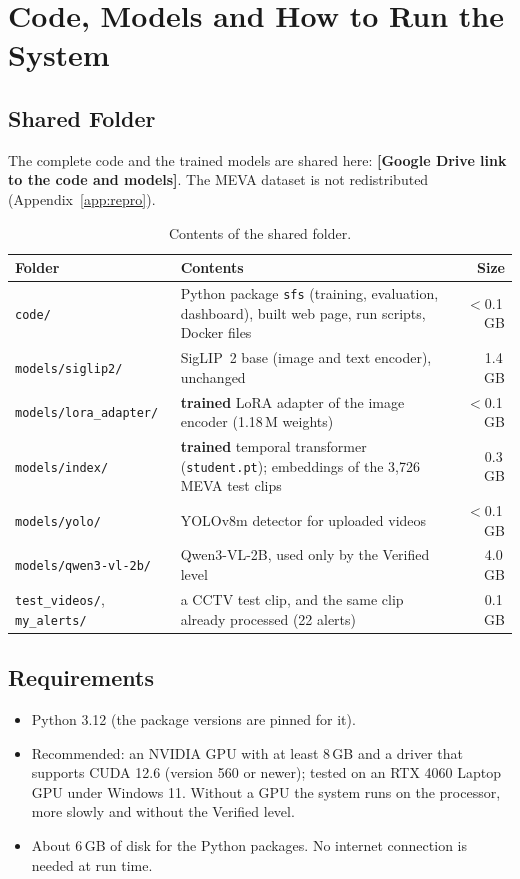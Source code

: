 \documentclass[11pt,a4paper]{article}
\newcommand{\CodeLink}{[Google Drive link to the code and models]}
\begin{document}
\appendix
\section{Code, Models and How to Run the System}\label{app:code}

\subsection{Shared Folder}
The complete code and the trained models are shared here: \textbf{\CodeLink}. The MEVA dataset is not
redistributed (Appendix~\ref{app:repro}).

\begin{table}[H]
\centering
\caption{Contents of the shared folder.}\label{tab:folder}
\small
\begin{tabular}{p{3.6cm}p{9.0cm}r}
\toprule
\textbf{Folder} & \textbf{Contents} & \textbf{Size} \\
\midrule
\texttt{code/} & Python package \texttt{sfs} (training, evaluation, dashboard), built web page, run scripts, Docker files & $<$0.1\,GB \\
\texttt{models/siglip2/} & SigLIP~2 base (image and text encoder), unchanged & 1.4\,GB \\
\texttt{models/lora\_adapter/} & \textbf{trained} LoRA adapter of the image encoder (1.18\,M weights) & $<$0.1\,GB \\
\texttt{models/index/} & \textbf{trained} temporal transformer (\texttt{student.pt}); embeddings of the 3,726 MEVA test clips & 0.3\,GB \\
\texttt{models/yolo/} & YOLOv8m detector for uploaded videos & $<$0.1\,GB \\
\texttt{models/qwen3-vl-2b/} & Qwen3-VL-2B, used only by the Verified level & 4.0\,GB \\
\texttt{test\_videos/}, \texttt{my\_alerts/} & a CCTV test clip, and the same clip already processed (22 alerts) & 0.1\,GB \\
\bottomrule
\end{tabular}
\end{table}

\subsection{Requirements}
\begin{itemize}
  \item Python 3.12 (the package versions are pinned for it).
  \item Recommended: an NVIDIA GPU with at least 8\,GB and a driver that supports CUDA 12.6 (version 560 or newer);
        tested on an RTX 4060 Laptop GPU under Windows 11. Without a GPU the system runs on the processor, more
        slowly and without the Verified level.
  \item About 6\,GB of disk for the Python packages. No internet connection is needed at run time.
\end{itemize}
\end{document}
